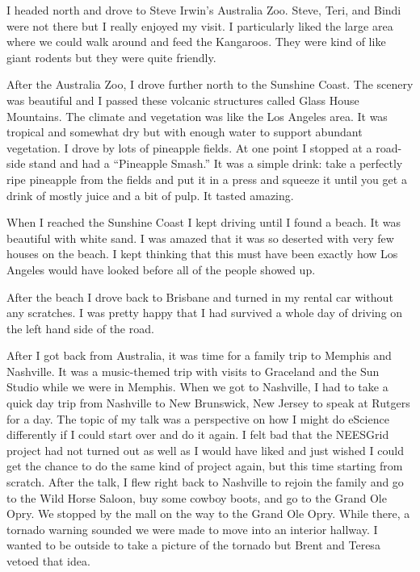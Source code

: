 \documentclass[12pt]{book}
\begin{document}
I headed north and drove to Steve Irwin's
Australia Zoo.   Steve, Teri, and Bindi were not there
but I really enjoyed my visit.  I particularly liked the large
area where we could walk around and feed the Kangaroos.
They were kind of like giant rodents but they were
quite friendly.

After the Australia Zoo, I drove further north to the
Sunshine Coast.  The scenery was beautiful and I passed
these volcanic structures called Glass House Mountains.
The climate and vegetation was like the Los Angeles
area.  It was tropical and somewhat dry but with enough
water to support abundant vegetation.  I drove by
lots of pineapple fields.   At one point I stopped
at a road-side stand and had a ``Pineapple Smash.''
It was a simple drink: take a perfectly ripe pineapple
from the fields and put it in a press and squeeze it
until you get a drink of mostly juice and a bit of pulp.
It tasted amazing.

When I reached the Sunshine Coast I kept driving until I found
a beach.  It was beautiful with white sand.  I was amazed
that it was so deserted with very few houses
on the beach.  I kept thinking that this must have been
exactly how Los Angeles would have looked before all of the
people showed up.

After the beach I drove back to Brisbane and turned in my rental
car without any scratches.  I was pretty happy that I had
survived a whole day of driving on the left hand side of the road.

After I got back from Australia, it was time for a family trip to Memphis and Nashville.
It was a music-themed trip with visits to Graceland and the Sun Studio while we were in
Memphis.  When we got to Nashville, I had to take a quick day trip from Nashville to
New Brunswick, New Jersey to speak at Rutgers for a day.  The topic of
my talk was a perspective on how I might do eScience differently if I could start
over and do it again.   I felt bad that the NEESGrid project had not turned out
as well as I would have liked and just wished I could get the chance to do the same
kind of project again, but this time starting from scratch. After the talk, I flew right
back  to Nashville to rejoin the family and go to the Wild Horse Saloon, buy some cowboy
boots, and go to the Grand Ole Opry.
We stopped by the mall on the way to the Grand Ole Opry. While there, a tornado
warning sounded we were made to move into an interior hallway.   I wanted to be outside
to take a picture of the tornado but Brent and Teresa vetoed that idea.
\end{document}
